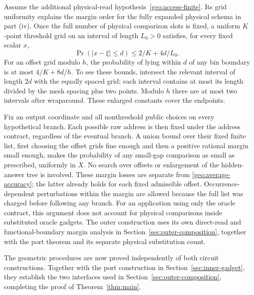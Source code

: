\begin{remark}\label{geo:late-margins}
Assume the additional physical-read
hypothesis~\ref{geo:access-finite}. Its grid uniformity explains the
margin order for the fully expanded physical schema in part (iv).
Once the full number of physical comparison slots is fixed, a
uniform $K$-point threshold grid on an interval of length $L_0>0$
satisfies, for every fixed scalar $x$,
\[
 \Pr(|x-\xi|\le d)\le2/K+4d/L_0.
\]
For an offset grid modulo $h$, the probability of lying within $d$
of any bin boundary is at most $4/K+8d/h$. To see these bounds,
intersect the relevant interval of length $2d$ with the equally spaced
grid; each interval contains at most its length divided by the mesh
spacing plus two points. Modulo $h$ there are at most two intervals
after wraparound. These enlarged constants cover the endpoints.

Fix an output coordinate and all nonthreshold public choices on every
hypothetical branch. Each possible raw address is then fixed under
the address contract, regardless of the eventual branch. A union bound
over their fixed finite list, first choosing the offset grids fine
enough and then a positive rational margin small enough, makes the
probability of any small-gap comparison as small as prescribed,
uniformly in $X$. No search over offsets or enlargement of the
hidden-answer tree is involved. These margin losses are separate from
\eqref{geo:average-accuracy}; the latter already holds for each fixed
admissible offset. Occurrence-dependent perturbations within the margin
are allowed because the full list was charged before following any
branch. For an application using only the oracle contract, this
argument does not account for physical comparisons inside substituted
oracle gadgets. The outer construction uses its own direct-read and
functional-boundary margin analysis in
Section~\ref{sec:outer-composition}, together with the port theorem
and its separate physical substitution count.
\end{remark}

The geometric procedures are now proved independently of both circuit
constructions. Together with the port construction in
Section~\ref{sec:inner-gadget}, they establish the two interfaces used in
Section~\ref{sec:outer-composition}, completing the proof of
Theorem~\ref{thm:main}.
